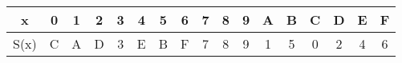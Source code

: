 \begin{tabular}{|c|c|c|c|c|c|c|c|c|c|c|c|c|c|c|c|c|}
\hline
x & 0 & 1 & 2 & 3 & 4 & 5 & 6 & 7 & 8 & 9 & A & B & C & D & E & F \\
\hline
S(x) & C & A & D & 3 & E & B & F & 7 & 8 & 9 & 1 & 5 & 0 & 2 & 4 & 6 \\
\hline
\end{tabular}